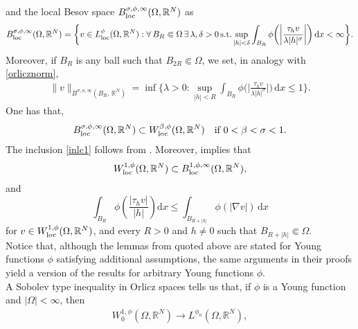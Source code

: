 \documentclass[leqno,11pt]{amsart}%
\numberwithin{equation}{section}
\def\d{\mathrm{d}}
\def\dx{\d x}
\theoremstyle{definition}
\numberwithin{equation}{section}
\begin{document}
 and the local Besov space  $B^{\sigma, \phi, \infty}_{\rm loc}(\Omega, \mathbb R^N)$ 
as 
\begin{align}\label{besov}
B^{\sigma, \phi, \infty}_{\rm loc}(\Omega, \mathbb R^N)= \bigg\{v\in L^\phi_{\rm loc}(\Omega, \mathbb R^N): \forall\,B_R\Subset  \Omega\,\exists\, \lambda, \delta>0 \, \text{s.t.}\sup_{|h|<\delta }    \int_{B_R}\phi\bigg(\bigg|\frac{\tau_hv}{\lambda |h|^\sigma}\bigg|\bigg)\, \d x < \infty\bigg\}.
\end{align}
{Moreover,  if $B_R$ is any ball such that $B_{2R}\Subset \Omega$, we set, in analogy with \eqref{orlicznorm},
\begin{align}
    \label{besovnorm}
    \|v\|_{B^{\sigma, \phi, \infty}(B_R, \,\mathbb R^N)}= \inf\bigg\{\lambda >0: \sup_{|h|<R }    \int_{B_R}\phi\bigg(\bigg|\frac{\tau_hv}{\lambda |h|^\sigma}\bigg|\bigg)\, \d x \leq 1\bigg\}.
\end{align}}
One has that, 
    {\begin{equation}
        \label{inlc1}
        B^{\sigma, \phi, \infty}_{\rm loc}(\Omega, \mathbb R^N) \subset W^{\beta, \phi}_{\rm loc}(\Omega, \mathbb R^N) \quad \text{if $0<\beta < \sigma <1$.}
    \end{equation}
    The inclusion \eqref{inlc1} follows from \cite[Lemma 2.13]{GPS}.
Moreover, \cite[Lemma 2.10]{GPS} implies that
\begin{align}
    \label{july10}
    W^{1,\phi}_{\rm loc}(\Omega, \mathbb R^N) \subset  B^{1,\phi, \infty}_{\rm loc}(\Omega, \mathbb R^N),
\end{align}
and 
\begin{equation}\label{est-diff-quotient}
    \int_{B_{R}} \phi\left(\frac{|\tau_{h} v|}{|h|}\right)\dx
    \leq
    \int_{B_{R+|h|}}\phi(|\nabla v|)\, \dx
  \end{equation}
 for $v\in W^{1,\phi}_{\rm loc}(\Omega, \mathbb R^N)$, and
 every $R>0$ and $h \neq 0$ such that $B_{R+|h|} \Subset \Omega$. 
\\
Notice that, although the lemmas from \cite{GPS} quoted above are stated for Young functions $\phi$ satisfying additional assumptions, the same arguments in their proofs yield a version of the results for arbitrary Young functions $\phi$.
\\
}
A Sobolev type inequality in Orlicz spaces tells us that, if $\phi$ is a Young function and $|\Omega|<\infty$, then
\begin{align}
    \label{OS-emb}
    W^{1,\phi}_0(\Omega, \mathbb R^N) \to L^{\phi_n}(\Omega, \mathbb R^N),
\end{align}
\end{document}
